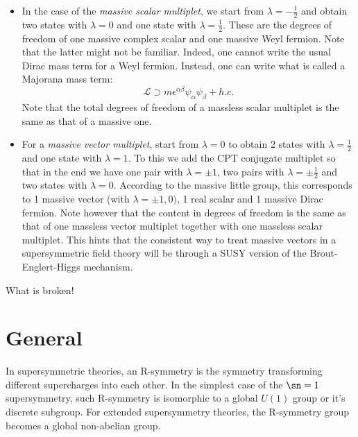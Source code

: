 \begin{example}
  \mbox{}
  \begin{itemize}
    \item In the case of the \textit{massive scalar multiplet}, we start from
      $\lambda =  -\frac{1}{2}$ and obtain two states with $\lambda=0$ and one
      state with $\lambda=\frac{1}{2}$. These are the degrees of freedom of one
      massive complex scalar and one massive Weyl fermion. Note that the latter
      might not be familiar. Indeed, one cannot write the usual Dirac mass term
      for a Weyl fermion. Instead, one can write what is called a Majorana mass
      term:
      \begin{equation}
        \mathcal{L}\supset m\epsilon^{\alpha\beta}\psi_\alpha\psi_\beta + h.c.
      \end{equation}
      Note that the total degrees of freedom of a massless scalar multiplet is
      the same as that of a massive one.
    \item For a \textit{massive vector multiplet}, start from $\lambda = 0$ to
      obtain 2 states with $\lambda = \frac{1}{2}$ and one state with $\lambda
      = 1$. To this we add the CPT conjugate multiplet so that in the end we
      have one pair with $\lambda = \pm1$, two pairs with
      $\lambda=\pm\frac{1}{2}$ and two states with $\lambda = 0$. According to
      the massive little group, this corresponds to 1 massive vector (with
      $\lambda = \pm1,0)$, 1 real scalar and 1 massive Dirac fermion. Note
      however that the content in degrees of freedom is the same as that of one
      massless vector multiplet together with one massless scalar multiplet.
      This hints that the consistent way to treat massive vectors in
      a supersymmetric field theory will be through a SUSY version of the
      Brout-Englert-Higgs mechanism.
    \end{itemize}

  \end{example}
What is broken!
\section{General}
\begin{definition}[R-symmetry]
In supersymmetric theories, an R-symmetry is the symmetry transforming different supercharges into each other. In the simplest case of the $\sn=1$ supersymmetry, such R-symmetry is isomorphic to a global $U(1)$ group or it's discrete subgroup. For extended supersymmetry theories, the R-symmetry group becomes a global non-abelian group.  
\end{definition}

